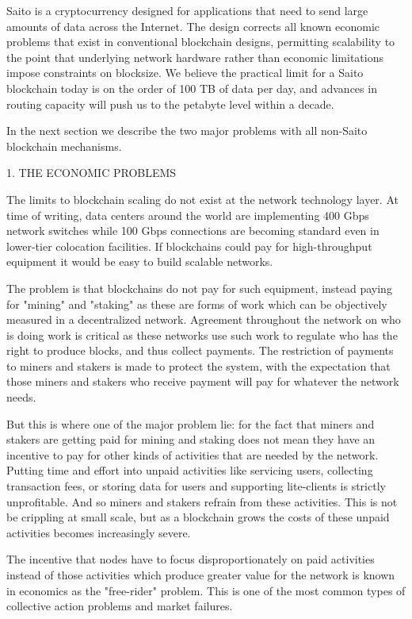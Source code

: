 \documentclass[11.5pt, oneside]{article}   	%
\begin{document}
\begin{multicols}{2}
Saito is a cryptocurrency designed for applications that need to send large amounts of data across the Internet. The design corrects all known economic problems that exist in conventional blockchain designs, permitting scalability to the point that underlying network hardware rather than economic limitations impose constraints on blocksize. We believe the practical limit for a Saito blockchain today is on the order of 100 TB of data per day, and advances in routing capacity will push us to the petabyte level within a decade.

In the next section we describe the two major problems with all non-Saito blockchain mechanisms.

1. THE ECONOMIC PROBLEMS

The limits to blockchain scaling do not exist at the network technology layer. At time of writing, data centers around the world are implementing 400 Gbps network switches while 100 Gbps connections are becoming standard even in lower-tier colocation facilities. If blockchains could pay for high-throughput equipment it would be easy to build scalable networks.

The problem is that blockchains do not pay for such equipment, instead paying for "mining" and "staking" as these are forms of work which can be objectively measured in a decentralized network. Agreement throughout the network on who is doing work is critical as these networks use such work to regulate who has the right to produce blocks, and thus collect payments. The restriction of payments to miners and stakers is made to protect the system, with the expectation that those miners and stakers who receive payment will pay for whatever the network needs.

But this is where one of the major problem lie: for the fact that miners and stakers are getting paid for mining and staking does not mean they have an incentive to pay for other kinds of activities that are needed by the network. Putting time and effort into unpaid activities like servicing users, collecting transaction fees, or storing data for users and supporting lite-clients is strictly unprofitable. And so miners and stakers refrain from these activities. This is not be crippling at small scale, but as a blockchain grows the costs of these unpaid activities becomes increasingly severe.

The incentive that nodes have to focus disproportionately on paid activities instead of those activities which produce greater value for the network is known in economics as the "free-rider" problem. This is one of the most common types of collective action problems and market failures.


\end{multicols}
\end{document}

